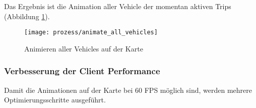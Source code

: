   Das Ergebnis ist die Animation aller Vehicle der momentan aktiven Trips (Abbildung \ref{fig:prozess/animate_all_vehicles}).

  \begin{figure}[htbp]
    \begin{center}
      \texttt{[image: prozess/animate\_all\_vehicles]}
      \caption{Animieren aller Vehicles auf der Karte}
      \label{fig:prozess/animate_all_vehicles}
    \end{center}
  \end{figure}

  \subsubsection*{Verbesserung der Client Performance}
  \label{ssub:verbesserung_der_client_performance}
    Damit die Animationen auf der Karte bei 60 FPS möglich sind, werden mehrere Optimierungsschritte ausgeführt.


